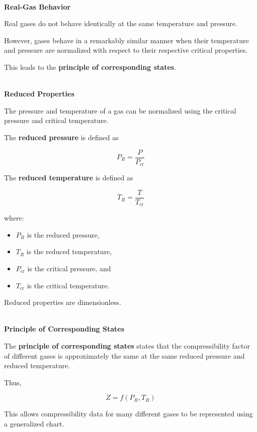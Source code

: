 \documentclass[12pt]{article}
\begin{document}
\textbf{\\ Real-Gas Behavior}

Real gases do not behave identically at the same temperature and pressure.

However, gases behave in a remarkably similar manner when their temperature and pressure are normalized with respect to their respective critical properties.

This leads to the \textbf{principle of corresponding states}.

\textbf{\\ Reduced Properties}

The pressure and temperature of a gas can be normalized using the critical pressure and critical temperature.

The \textbf{reduced pressure} is defined as

\begin{equation*}
\boxed{
P_R=\frac{P}{P_{\mathrm{cr}}}
}
\end{equation*}

The \textbf{reduced temperature} is defined as

\begin{equation*}
\boxed{
T_R=\frac{T}{T_{\mathrm{cr}}}
}
\end{equation*}

where:
\begin{itemize}
    \item $P_R$ is the reduced pressure,
    \item $T_R$ is the reduced temperature,
    \item $P_{\mathrm{cr}}$ is the critical pressure, and
    \item $T_{\mathrm{cr}}$ is the critical temperature.
\end{itemize}

Reduced properties are dimensionless.

\textbf{\\ Principle of Corresponding States}

The \textbf{principle of corresponding states} states that the compressibility factor of different gases is approximately the same at the same reduced pressure and reduced temperature.

Thus,

\begin{equation*}
\boxed{
Z=f(P_R,T_R)
}
\end{equation*}

This allows compressibility data for many different gases to be represented using a generalized chart.
\end{document}
